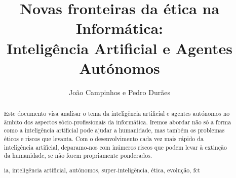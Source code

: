 \documentclass[runningheads,a4paper]{llncs}
\newcommand{\keywords}[1]{\par\addvspace\baselineskip\noindent\keywordname\enspace\ignorespaces#1}
\begin{document}
\mainmatter%

\title{Novas fronteiras da ética na Informática:\\Inteligência Artificial e Agentes Autónomos}


%
%
\author{João Campinhos e Pedro Durães}
%


%
%

\maketitle


\begin{abstract}
  Este documento visa analisar o tema da inteligência artificial e agentes autónomos no âmbito dos aspectos sócio-profissionais da informática.
  Iremos abordar não só a forma como a inteligência artificial pode ajudar a humanidade, mas também os problemas éticos e riscos que levanta.
  Com o desenvolvimento cada vez mais rápido da inteligência artificial, deparamo-nos com inúmeros riscos que podem levar à extinção da humanidade, se não forem propriamente ponderados.
  \keywords{ia, inteligência artificial, autónomos, super-inteligência, ética, evolução, fct}
\end{abstract}
\end{document}
